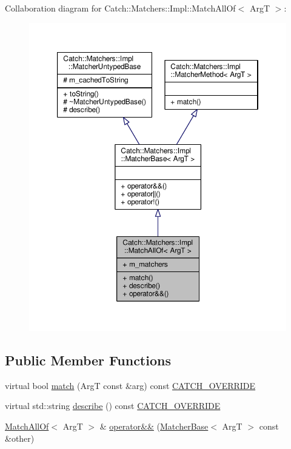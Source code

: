 Collaboration diagram for Catch\-:\-:Matchers\-:\-:Impl\-:\-:Match\-All\-Of$<$ Arg\-T $>$\-:
\nopagebreak
\begin{figure}[H]
\begin{center}
\leavevmode
\includegraphics[width=350pt]{struct_catch_1_1_matchers_1_1_impl_1_1_match_all_of__coll__graph}
\end{center}
\end{figure}
\subsection*{Public Member Functions}
\begin{DoxyCompactItemize}
\item 
virtual bool \hyperlink{struct_catch_1_1_matchers_1_1_impl_1_1_match_all_of_a7bf0c2d8cedf67ecf9d0a527cb5a8263}{match} (Arg\-T const \&arg) const \hyperlink{catch_8hpp_a8ecdce4d3f57835f707915ae831eb847}{C\-A\-T\-C\-H\-\_\-\-O\-V\-E\-R\-R\-I\-D\-E}
\item 
virtual std\-::string \hyperlink{struct_catch_1_1_matchers_1_1_impl_1_1_match_all_of_aaefeba99a0b35425203468a65bff544b}{describe} () const \hyperlink{catch_8hpp_a8ecdce4d3f57835f707915ae831eb847}{C\-A\-T\-C\-H\-\_\-\-O\-V\-E\-R\-R\-I\-D\-E}
\item 
\hyperlink{struct_catch_1_1_matchers_1_1_impl_1_1_match_all_of}{Match\-All\-Of}$<$ Arg\-T $>$ \& \hyperlink{struct_catch_1_1_matchers_1_1_impl_1_1_match_all_of_a3844f9fb55f7a77155576ddc1e3f90d7}{operator\&\&} (\hyperlink{struct_catch_1_1_matchers_1_1_impl_1_1_matcher_base}{Matcher\-Base}$<$ Arg\-T $>$ const \&other)
\end{DoxyCompactItemize}
